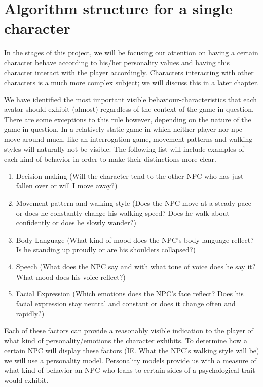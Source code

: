 \documentclass{article}
\begin{document}
  \newpage
  \section{Algorithm structure for a single character}
  In the stages of this project, we will be focusing our attention on having a certain character behave according to his/her personality values and having this character interact with the player accordingly. Characters interacting with other characters is a much more complex subject; we will discuss this in a later chapter. 

  We have identified the most important visible behaviour-characteristics that each avatar should exhibit (almost) regardless of the context of the game in question. There are some exceptions to this rule however, depending on the nature of the game in question. In a relatively static game in which neither player nor npc move around much, like an interrogation-game, movement patterns and walking styles will naturally not be visible. The following list will include examples of each kind of behavior in order to make their distinctions more clear.

  \begin{enumerate}
  	\item Decision-making (Will the character tend to the other NPC who has just fallen over or will I move away?)
  	\item Movement pattern and walking style (Does the NPC move at a steady pace or does he constantly change his walking speed?
  											  Does he walk about confidently or does he slowly wander?) 
  	\item Body Language (What kind of mood does the NPC's body language reflect? Is he standing up proudly or are his shoulders collapsed?)
  	\item Speech (What does the NPC say and with what tone of voice does he say it? What mood does his voice reflect?)
  	\item Facial Expression (Which emotions does the NPC's face reflect? Does his facial expression stay neutral and constant or does it change often and rapidly?)
  \end{enumerate}

  Each of these factors can provide a reasonably visible indication to the player of what kind of personality/emotions the character exhibits. 
  To determine how a certain NPC will display these factors (IE. What the NPC's walking style will be) we will use a personality model. Personality models provide us with a measure of what kind of behavior an NPC who leans to certain sides of a psychological trait would exhibit. 
\end{document}
